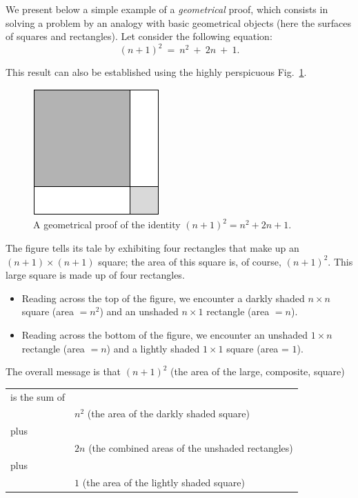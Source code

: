 We present below a simple example of a \textit{geometrical} proof, 
which consists in solving a problem by an analogy with basic geometrical objects
(here the surfaces of squares and rectangles). 
Let consider the following equation:
\begin{equation}
(n+1)^2 \ = \ n^2 \ + \ 2n \ + \ 1.
\end{equation}

This result can also be established using the highly perspicuous
Fig.~\ref{fig:proofa2plusb2}.
\begin{figure}[ht]
\begin{center}
       \includegraphics[scale=0.4]{FiguresMaths/proofa2plusb2}
\caption{A geometrical proof of the identity $(n+1)^2 = n^2 + 2n + 1$.}
       \label{fig:proofa2plusb2}
\end{center}
\end{figure}
The figure tells its tale by exhibiting four rectangles that make up
an $(n+1) \times (n+1)$ square; the area of this square is, of course,
$(n+1)^2$.  This large square is made up of four rectangles.
\begin{itemize}
\item
Reading across the top of the figure, we encounter a darkly shaded $n
\times n$ square (area $= n^2$) and an unshaded $n \times 1$ rectangle
(area $= n$).
\item
Reading across the bottom of the figure, we encounter an unshaded $1
\times n$ rectangle (area $= n$) and a lightly shaded $1 \times 1$
square (area = $1$).
\end{itemize}
The overall message is that $(n+1)^2$ (the area of the large,
composite, square)

\begin{tabular}{ll}
is the sum of & \\
  & $n^2$ (the area of the darkly shaded square) \\
plus & \\
  & $2n$ (the combined areas of the unshaded rectangles) \\
plus & \\
  & $1$ (the area of the lightly shaded square)
\end{tabular}
\medskip

